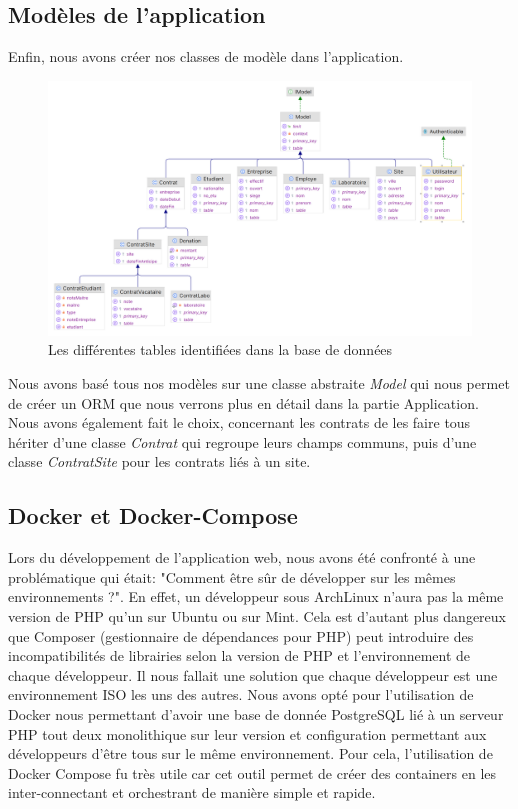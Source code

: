\documentclass[french,12pt,a4paper,titlepage]{report}
\begin{document}
		\subsection{Modèles de l'application}
		Enfin, nous avons créer nos classes de modèle dans l'application.
		\newline
		\begin{figure}[ht]
			\centering
			\includegraphics[width=1\linewidth]{rapports_assets/app_model_classes.png} 
			\caption{Les différentes tables identifiées dans la base de données}
		\end{figure}
		\newline
		Nous avons basé tous nos modèles sur une classe abstraite \textit{Model} qui nous permet de créer un ORM que nous verrons plus en détail dans la partie Application.
		\newline
		Nous avons également fait le choix, concernant les contrats de les faire tous hériter d'une classe \textit{Contrat} qui regroupe leurs champs communs, puis d'une classe \textit{ContratSite} pour les contrats liés à un site.
		\subsection{Docker et Docker-Compose}
		Lors du développement de l'application web, nous avons été confronté à une problématique qui était: "Comment être sûr de développer sur les mêmes environnements ?". En effet, un développeur sous ArchLinux n'aura pas la même version de PHP qu'un sur Ubuntu ou sur Mint. Cela est d'autant plus dangereux que Composer (gestionnaire de dépendances pour PHP) peut introduire des incompatibilités de librairies selon la version de PHP et l'environnement de chaque développeur. Il nous fallait une solution que chaque développeur est une environnement ISO les uns des autres.
		\newline
		Nous avons opté pour l'utilisation de Docker nous permettant d'avoir une base de donnée PostgreSQL lié à un serveur PHP tout deux monolithique sur leur version et configuration permettant aux développeurs d'être tous sur le même environnement. Pour cela, l'utilisation de Docker Compose fu très utile car cet outil permet de créer des containers en les inter-connectant et orchestrant de manière simple et rapide.
\end{document}
